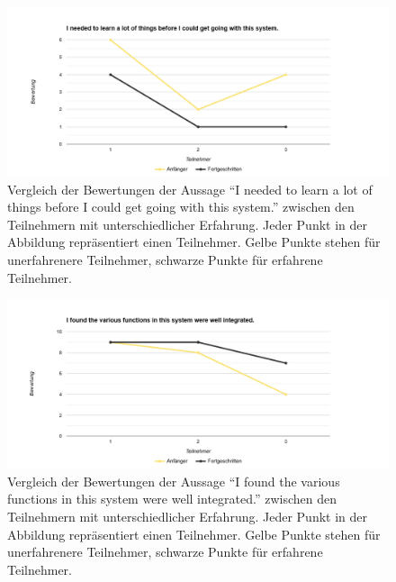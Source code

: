 \documentclass[german,version-2020-11]{uzl-thesis}
\begin{document}
  \begin{figure}[htpb]
    \centering
    \includegraphics[scale=0.4]{figures/group2.png}
    \caption{Vergleich der Bewertungen der Aussage ``I needed to learn a lot of things before I could get going with this system.'' zwischen den Teilnehmern mit unterschiedlicher Erfahrung. 
    Jeder Punkt in der Abbildung repräsentiert einen Teilnehmer. Gelbe Punkte stehen für unerfahrenere Teilnehmer, schwarze Punkte für erfahrene Teilnehmer. }
    \label{fig-group2}
  \end{figure}

  \begin{figure}[htpb]
    \centering
    \includegraphics[scale=0.4]{figures/group3.png}
    \caption{Vergleich der Bewertungen der Aussage ``I found the various functions in this system were well integrated.'' zwischen den Teilnehmern mit unterschiedlicher Erfahrung. 
              Jeder Punkt in der Abbildung repräsentiert einen Teilnehmer. Gelbe Punkte stehen für unerfahrenere Teilnehmer, schwarze Punkte für erfahrene Teilnehmer. }
    \label{fig-group3}
  \end{figure}
\end{document}
